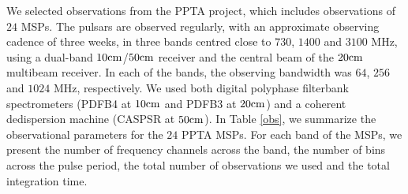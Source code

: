 \documentclass[useAMS,usenatbib]{mn2e}
\begin{document}
We selected observations from the PPTA project, which includes observations 
of $24$ MSPs. 
%
The pulsars are observed regularly, with an approximate observing cadence of 
three weeks, in three bands centred close to $730$, $1400$ and $3100$ MHz, 
using a dual-band $10\rm{cm}$/$50\rm{cm}$ receiver and the central beam 
of the $20\rm{cm}$ multibeam receiver. In each of the bands, the observing 
bandwidth was $64$, $256$ and $1024$ MHz, respectively. 
%
We used both digital polyphase filterbank spectrometers (PDFB4 at $10\rm{cm}$ 
and PDFB3 at $20\rm{cm}$) and a coherent dedispersion machine (CASPSR at $50\rm{cm}$). 
%
In Table \ref{obs}, we summarize the observational parameters for the $24$ PPTA MSPs. 
%
For each band of the MSPs, we present the number of frequency channels across 
the band, the number of bins across the pulse period, the total number 
of observations we used and the total integration time.
%
%
\end{document}
